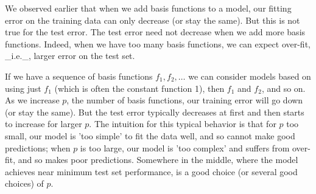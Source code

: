 We observed earlier that when we add basis functions to a model, our fitting error on the training data can only decrease (or stay the same). But this is not true for the test error. The test error need not decrease when we add more basis functions. Indeed, when we have too many basis functions, we can expect over-fit, _i.e._, larger error on the test set.

If we have a sequence of basis functions \(f_{1},f_{2},\ldots\) we can consider models based on using just \(f_{1}\) (which is often the constant function 1), then \(f_{1}\) and \(f_{2}\), and so on. As we increase \(p\), the number of basis functions, our training error will go down (or stay the same). But the test error typically decreases at first and then starts to increase for larger \(p\). The intuition for this typical behavior is that for \(p\) too small, our model is 'too simple' to fit the data well, and so cannot make good predictions; when \(p\) is too large, our model is 'too complex' and suffers from over-fit, and so makes poor predictions. Somewhere in the middle, where the model achieves near minimum test set performance, is a good choice (or several good choices) of \(p\).

 